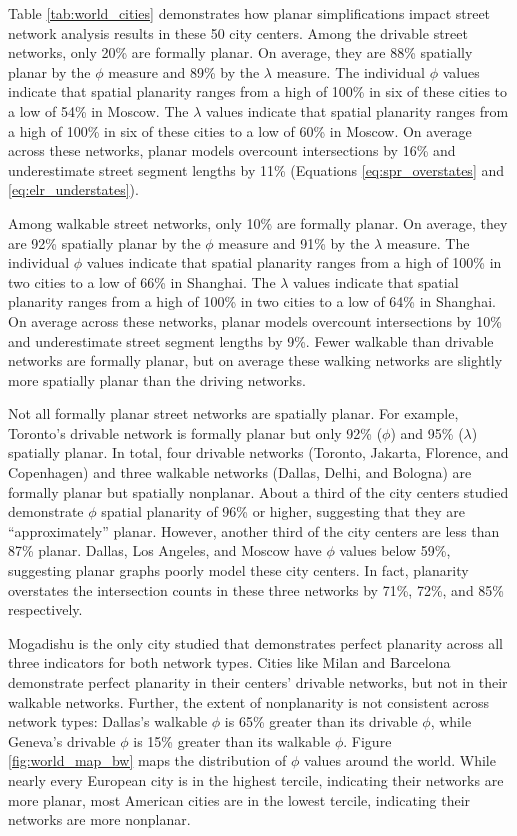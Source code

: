 \documentclass[Afour,sageh,times]{sagej}
\begin{document}
Table \ref{tab:world_cities} demonstrates how planar simplifications impact street network analysis results in these 50 city centers. Among the drivable street networks, only 20\% are formally planar. On average, they are 88\% spatially planar by the $\phi$ measure and 89\% by the $\lambda$ measure. The individual $\phi$ values indicate that spatial planarity ranges from a high of 100\% in six of these cities to a low of 54\% in Moscow. The $\lambda$ values indicate that spatial planarity ranges from a high of 100\% in six of these cities to a low of 60\% in Moscow. On average across these networks, planar models overcount intersections by 16\% and underestimate street segment lengths by 11\% (Equations \ref{eq:spr_overstates} and \ref{eq:elr_understates}).

Among walkable street networks, only 10\% are formally planar. On average, they are 92\% spatially planar by the $\phi$ measure and 91\% by the $\lambda$ measure. The individual $\phi$ values indicate that spatial planarity ranges from a high of 100\% in two cities to a low of 66\% in Shanghai. The $\lambda$ values indicate that spatial planarity ranges from a high of 100\% in two cities to a low of 64\% in Shanghai. On average across these networks, planar models overcount intersections by 10\% and underestimate street segment lengths by 9\%. Fewer walkable than drivable networks are formally planar, but on average these walking networks are slightly more spatially planar than the driving networks.

Not all formally planar street networks are spatially planar. For example, Toronto's drivable network is formally planar but only 92\% ($\phi$) and 95\% ($\lambda$) spatially planar. In total, four drivable networks (Toronto, Jakarta, Florence, and Copenhagen) and three walkable networks (Dallas, Delhi, and Bologna) are formally planar but spatially nonplanar. About a third of the city centers studied demonstrate $\phi$ spatial planarity of 96\% or higher, suggesting that they are \enquote{approximately} planar. However, another third of the city centers are less than 87\% planar. Dallas, Los Angeles, and Moscow have $\phi$ values below 59\%, suggesting planar graphs poorly model these city centers. In fact, planarity overstates the intersection counts in these three networks by 71\%, 72\%, and 85\% respectively.

Mogadishu is the only city studied that demonstrates perfect planarity across all three indicators for both network types. Cities like Milan and Barcelona demonstrate perfect planarity in their centers' drivable networks, but not in their walkable networks. Further, the extent of nonplanarity is not consistent across network types: Dallas's walkable $\phi$ is 65\% greater than its drivable $\phi$, while Geneva's drivable $\phi$ is 15\% greater than its walkable $\phi$. Figure \ref{fig:world_map_bw} maps the distribution of $\phi$ values around the world. While nearly every European city is in the highest tercile, indicating their networks are more planar, most American cities are in the lowest tercile, indicating their networks are more nonplanar.
\end{document}
